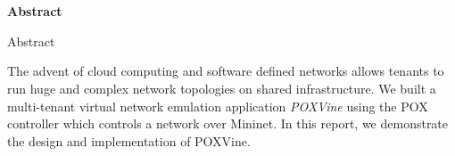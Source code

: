 \chapter*{}
\begin{center}
\textbf{Abstract}
\end{center}
Abstract
The advent of cloud computing and software defined networks allows tenants to run huge and complex network topologies on shared infrastructure. We built a multi-tenant virtual network emulation application \emph{POXVine} using the POX controller which controls a network over Mininet. In this report, we demonstrate the design and implementation of POXVine. 
